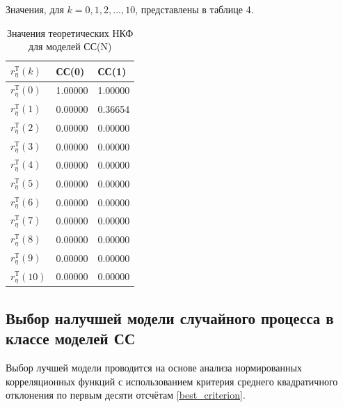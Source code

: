 \documentclass[12pt, fleqn]{article}
\begin{document}
{{{			Значения, для $k = 0,1,2,\dots,10$, представлены в таблице 4.
			\begin{table}[H]\label{tbl_ncf_ar}
				\centering
				\caption{Значения теоретических НКФ для моделей СС(N)}
				\begin{tabularx}{0.9\textwidth}{ |Y|Y|Y| }
					\hline
					$r_{\eta}^{\text{Т}}(k)$  & СС(0) & СС(1) \\ \hline
					$r_{\eta}^{\text{Т}}(0)$  & 1.00000 & 1.00000 \\ \hline
					$r_{\eta}^{\text{Т}}(1)$  & 0.00000 & 0.36654 \\ \hline
					$r_{\eta}^{\text{Т}}(2)$  & 0.00000 & 0.00000 \\ \hline
					$r_{\eta}^{\text{Т}}(3)$  & 0.00000 & 0.00000 \\ \hline
					$r_{\eta}^{\text{Т}}(4)$  & 0.00000 & 0.00000 \\ \hline
					$r_{\eta}^{\text{Т}}(5)$  & 0.00000 & 0.00000 \\ \hline
					$r_{\eta}^{\text{Т}}(6)$  & 0.00000 & 0.00000 \\ \hline
					$r_{\eta}^{\text{Т}}(7)$  & 0.00000 & 0.00000 \\ \hline
					$r_{\eta}^{\text{Т}}(8)$  & 0.00000 & 0.00000 \\ \hline
					$r_{\eta}^{\text{Т}}(9)$  & 0.00000 & 0.00000 \\ \hline
					$r_{\eta}^{\text{Т}}(10)$ & 0.00000 & 0.00000 \\ \hline
				\end{tabularx}
			\end{table}
		}
		\subsection{Выбор налучшей модели случайного процесса в классе моделей СС} {
			Выбор лучшей модели проводится на основе анализа нормированных корреляционных функций с использованием критерия среднего квадратичного отклонения по первым десяти отсчётам \eqref{best_criterion}.
					
}}}
\end{document}
